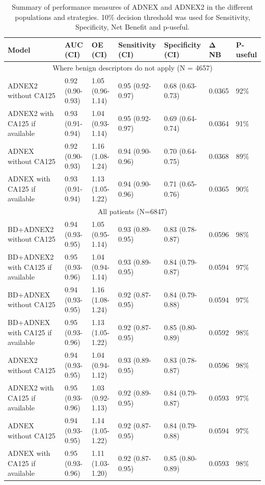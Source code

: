 \begin{table}
\centering
\scriptsize
\caption[Performance measures of ADNEX2 and ADNEX]{Summary of performance measures of ADNEX and ADNEX2 in the different populations and strategies. 10\% decision threshold was used for Sensitivity, Specificity, Net Benefit and p-useful.}
\label{tab:ADNEX2:2}
 \begin{tabularx}{\textwidth}{p{2.80cm}XXXXp{0.75cm}p{1.05cm}}
    \toprule
       \textbf{Model} & \textbf{AUC (CI)} &  \textbf{OE (CI)} & \textbf{Sensitivity (CI)} & \textbf{Specificity (CI)} & \textbf{Δ NB} & \textbf{P-useful} \\ 
        \midrule
        \multicolumn{7}{c}{Where benign descriptors do not apply (N = 4657)}  \\ 
        \midrule

        ADNEX2 without CA125 & 0.92 (0.90-0.93)  & 1.05 (0.96-1.14) & 0.95 (0.92-0.97) & 0.68 (0.63-0.73) & 0.0365 & 92\% \\ 
        ADNEX2 with CA125 if available & 0.93 (0.91-0.94)  & 1.04 (0.93-1.14) & 0.95 (0.92-0.97) & 0.69 (0.64-0.74) & 0.0364 & 91\% \\ 
        ADNEX without CA125 & 0.92 (0.90-0.93) & 1.16 (1.08-1.24) & 0.94 (0.90-0.96) & 0.70 (0.64-0.75) & 0.0368 & 89\% \\ 
        ADNEX with CA125 if available & 0.93 (0.91-0.94)  & 1.13 (1.05-1.22) & 0.94 (0.90-0.96) & 0.71 (0.65-0.76) & 0.0365 & 90\% \\ 
        \midrule
        \multicolumn{7}{c}{All patients (N=6847)} \\ 
        \midrule

        BD+ADNEX2 without CA125 & 0.94 (0.93-0.95) & 1.05 (0.95-1.14) & 0.93 (0.89-0.95) & 0.83 (0.78-0.87) & 0.0596 & 98\% \\ 
        BD+ADNEX2 with CA125 if available & 0.95 (0.93-0.96)  & 1.04 (0.94-1.14) & 0.93 (0.89-0.95) & 0.84 (0.79-0.87) & 0.0594 & 97\% \\ 
        BD+ADNEX without CA125 & 0.94 (0.93-0.95)  & 1.16 (1.08-1.24) & 0.92 (0.87-0.95) & 0.84 (0.79-0.88) & 0.0594 & 97\% \\ 
        BD+ADNEX with CA125 if available & 0.95 (0.93-0.96) & 1.13 (1.05-1.22) & 0.92 (0.87-0.95) & 0.85 (0.80-0.89) & 0.0592 & 98\% \\ 
        ADNEX2 without CA125 & 0.94 (0.93-0.95)  & 1.04 (0.94-1.12) & 0.93 (0.89-0.95) & 0.83 (0.78-0.87) & 0.0596 & 98\% \\ 
        ADNEX2 with CA125 if available & 0.95 (0.93-0.96)  & 1.03 (0.92-1.13) & 0.92 (0.89-0.95) & 0.84 (0.79-0.87) & 0.0593 & 97\% \\ 
        ADNEX without CA125 & 0.94 (0.93-0.95)  & 1.14 (1.05-1.22) & 0.92 (0.87-0.95) & 0.84 (0.79-0.88) & 0.0594 & 97\% \\ 
        ADNEX with CA125 if available & 0.95 (0.93-0.96) & 1.11 (1.03-1.20) & 0.92 (0.87-0.95) & 0.85 (0.80-0.89) & 0.0593 & 98\% \\ 
        \bottomrule
    \end{tabularx}
    \noindent\begin{minipage}{\textwidth}
\raggedright\footnotesize
\addlinespace[0.5em]


\end{minipage}
\end{table}
